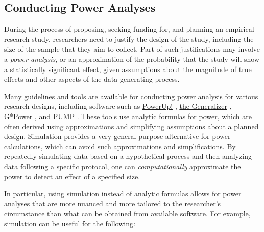 \documentclass[
]{book}
\begin{document}
\subsection{Conducting Power Analyses}\label{conducting-power-analyses}

During the process of proposing, seeking funding for, and planning an empirical research study, researchers need to justify the design of the study, including the size of the sample that they aim to collect.
Part of such justifications may involve a \emph{power analysis}, or an approximation of the probability that the study will show a statistically significant effect, given assumptions about the magnitude of true effects and other aspects of the data-generating process.

Many guidelines and tools are available for conducting power analysis for various research designs, including software such as \href{https://www.causalevaluation.org/power-analysis.html}{PowerUp!} \citep{dong2013PowerUpToolCalculating}, \href{https://www.thegeneralizer.org/}{the Generalizer} \citep{tipton2014stratified}, \href{https://www.psychologie.hhu.de/arbeitsgruppen/allgemeine-psychologie-und-arbeitspsychologie/gpower}{G*Power} \citep{faul2009StatisticalPowerAnalyses}, and \href{https://cran.r-project.org/web//packages/PUMP/index.html}{PUMP} \citep{hunter2023PowerMultiplicityProject}.
These tools use analytic formulas for power, which are often derived using approximations and simplifying assumptions about a planned design. Simulation provides a very general-purpose alternative for power calculations, which can avoid such approximations and simplifications.
By repeatedly simulating data based on a hypothetical process and then analyzing data following a specific protocol, one can \emph{computationally} approximate the power to detect an effect of a specified size.

In particular, using simulation instead of analytic formulas allows for power analyses that are more nuanced and more tailored to the researcher's circumstance than what can be obtained from available software.
For example, simulation can be useful for the following:
\end{document}
